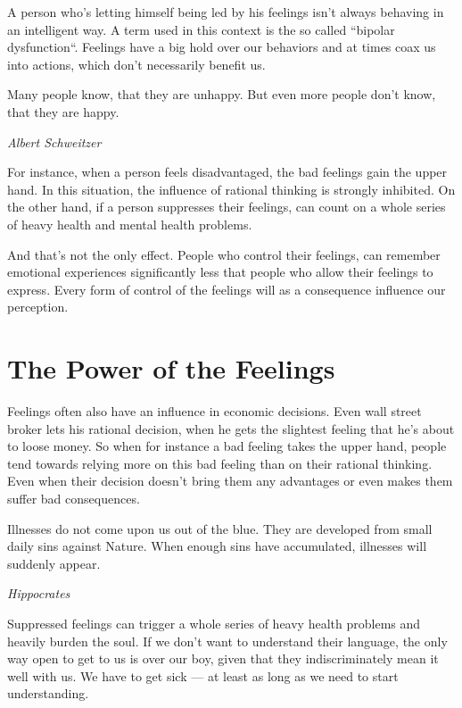 \documentclass[../main.tex]{subfiles}
\begin{document}
A person who's letting himself being led by his feelings isn't always behaving in an intelligent way.
A term used in this context is the so called ``bipolar dysfunction``.
Feelings have a big hold over our behaviors and at times coax us into actions, which don't necessarily benefit us.

\epigraph{Many people know, that they are unhappy. But even more people don't know, that they are happy.}{\textit{Albert Schweitzer}}

For instance, when a person feels disadvantaged, the bad feelings gain the upper hand.
In this situation, the influence of rational thinking is strongly inhibited.
On the other hand, if a person suppresses their feelings, can count on a whole series of heavy health and mental health problems.

And that's not the only effect.
People who control their feelings, can remember emotional experiences significantly less that people who allow their feelings to express.
Every form of control of the feelings will as a consequence influence our perception.

\section{The Power of the Feelings}


Feelings often also have an influence in economic decisions.
Even wall street broker lets his rational decision, when he gets the slightest feeling that he's about to loose money.
So when for instance a bad feeling takes the upper hand, people tend towards relying more on this bad feeling than on their rational thinking.
Even when their decision doesn't bring them any advantages or even makes them suffer bad consequences.

\epigraph{Illnesses do not come upon us out of the blue. They are developed from small daily sins against Nature.
  When enough sins have accumulated, illnesses will suddenly appear.}{\textit{Hippocrates}}

Suppressed feelings can trigger a whole series of heavy health problems and heavily burden the soul.
If we don't want to understand their language, the only way open to get to us is over our boy, given that they indiscriminately mean it well with us.
We have to get sick --- at least as long as we need to start understanding.

\vspace{1cm}
\end{document}
